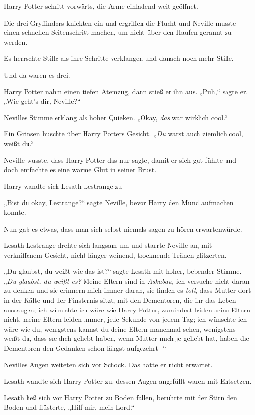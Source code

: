 {Harry Potter schritt vorwärts, die Arme einladend weit geöffnet.

Die drei Gryffindors knickten ein und ergriffen die Flucht und Neville musste einen schnellen Seitenschritt machen, um nicht über den Haufen gerannt zu werden.

Es herrschte Stille als ihre Schritte verklangen und danach noch mehr Stille.

Und da waren es drei.

Harry Potter nahm einen tiefen Atemzug, dann stieß er ihn aus. „Puh,“ sagte er. „Wie geht's dir, Neville?“

Nevilles Stimme erklang als hoher Quieken. „Okay, \emph{das} war wirklich cool.“

Ein Grinsen huschte über Harry Potters Gesicht. „\emph{Du} warst auch ziemlich cool, weißt du.“

Neville wusste, dass Harry Potter das nur sagte, damit er sich gut fühlte und doch entfachte es eine warme Glut in seiner Brust.

Harry wandte sich Lesath Lestrange zu -

„Bist du okay, Lestrange?“ sagte Neville, bevor Harry den Mund aufmachen konnte.

Nun gab es etwas, dass man sich selbst niemals sagen zu hören erwartenwürde.

Lesath Lestrange drehte sich langsam um und starrte Neville an, mit verkniffenem Gesicht, nicht länger weinend, trocknende Tränen glitzerten.

„Du glaubst, du weißt wie das ist?“ sagte Lesath mit hoher, bebender Stimme. „\emph{Du glaubst, du weißt es?} Meine Eltern sind in \emph{Askaban,} ich versuche nicht daran zu denken und sie erinnern mich immer daran, sie finden es \emph{toll,} dass Mutter dort in der Kälte und der Finsternis sitzt, mit den Dementoren, die ihr das Leben aussaugen; ich wünschte ich wäre wie Harry Potter, zumindest leiden seine Eltern nicht, meine Eltern leiden immer, jede Sekunde von jedem Tag; ich wünschte ich wäre wie du, wenigstens kannst du deine Eltern manchmal sehen, wenigstens weißt du, dass sie dich geliebt haben, wenn Mutter mich je geliebt hat, haben die Dementoren den Gedanken schon längst aufgezehrt -“

Nevilles Augen weiteten sich vor Schock. Das hatte er nicht erwartet.

Lesath wandte sich Harry Potter zu, dessen Augen angefüllt waren mit Entsetzen.

Lesath ließ sich vor Harry Potter zu Boden fallen, berührte mit der Stirn den Boden und flüsterte, „Hilf mir, mein Lord.“

}
